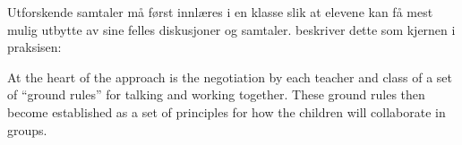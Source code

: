 \documentclass[main.tex]{subfiles}
\begin{document}
\newline
\newline
Utforskende samtaler må først innlæres i en klasse slik at elevene kan få mest mulig
utbytte av sine felles diskusjoner og samtaler.  beskriver dette som kjernen i 
praksisen:
\begin{displayquote}
At the heart of the approach is the negotiation by each teacher and class of a set of ``ground
rules'' for talking and working together. These ground rules then become established as a set of 
principles for how the children will collaborate in groups.
\end{displayquote}
\end{document}
